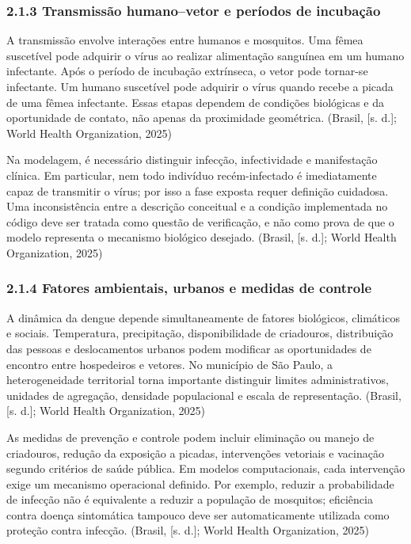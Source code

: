 \subsubsection{2.1.3 Transmissão humano--vetor e períodos de
incubação}\label{transmissuxe3o-humanovetor-e-peruxedodos-de-incubauxe7uxe3o}

A transmissão envolve interações entre humanos e mosquitos. Uma fêmea
suscetível pode adquirir o vírus ao realizar alimentação sanguínea em um
humano infectante. Após o período de incubação extrínseca, o vetor pode
tornar-se infectante. Um humano suscetível pode adquirir o vírus quando
recebe a picada de uma fêmea infectante. Essas etapas dependem de
condições biológicas e da oportunidade de contato, não apenas da
proximidade geométrica. (Brasil, {[}s. d.{]}; World Health Organization,
2025)

Na modelagem, é necessário distinguir infecção, infectividade e
manifestação clínica. Em particular, nem todo indivíduo recém-infectado
é imediatamente capaz de transmitir o vírus; por isso a fase exposta
requer definição cuidadosa. Uma inconsistência entre a descrição
conceitual e a condição implementada no código deve ser tratada como
questão de verificação, e não como prova de que o modelo representa o
mecanismo biológico desejado. (Brasil, {[}s. d.{]}; World Health
Organization, 2025)

\subsubsection{2.1.4 Fatores ambientais, urbanos e medidas de
controle}\label{fatores-ambientais-urbanos-e-medidas-de-controle}

A dinâmica da dengue depende simultaneamente de fatores biológicos,
climáticos e sociais. Temperatura, precipitação, disponibilidade de
criadouros, distribuição das pessoas e deslocamentos urbanos podem
modificar as oportunidades de encontro entre hospedeiros e vetores. No
município de São Paulo, a heterogeneidade territorial torna importante
distinguir limites administrativos, unidades de agregação, densidade
populacional e escala de representação. (Brasil, {[}s. d.{]}; World
Health Organization, 2025)

As medidas de prevenção e controle podem incluir eliminação ou manejo de
criadouros, redução da exposição a picadas, intervenções vetoriais e
vacinação segundo critérios de saúde pública. Em modelos computacionais,
cada intervenção exige um mecanismo operacional definido. Por exemplo,
reduzir a probabilidade de infecção não é equivalente a reduzir a
população de mosquitos; eficiência contra doença sintomática tampouco
deve ser automaticamente utilizada como proteção contra infecção.
(Brasil, {[}s. d.{]}; World Health Organization, 2025)


